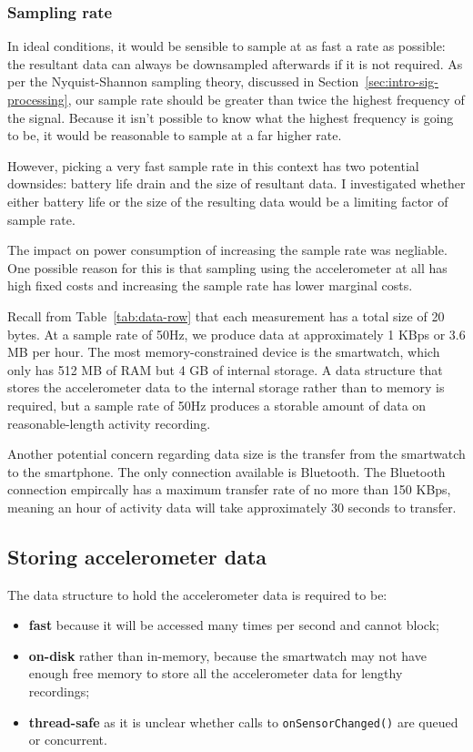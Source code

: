       \subsubsection{Sampling rate}
        In ideal conditions, it would be sensible to sample at as fast a rate as possible: the resultant data can always be downsampled afterwards if it is not required. As per the Nyquist-Shannon sampling theory, discussed in Section~\ref{sec:intro-sig-processing}, our sample rate should be greater than twice the highest frequency of the signal. Because it isn't possible to know what the highest frequency is going to be, it would be reasonable to sample at a far higher rate. 
        
        However, picking a very fast sample rate in this context has two potential downsides: battery life drain and the size of resultant data. I investigated whether either battery life or the size of the resulting data would be a limiting factor of sample rate.
        
        The impact on power consumption of increasing the sample rate was negliable. One possible reason for this is that sampling using the accelerometer at all has high fixed costs and increasing the sample rate has lower marginal costs.
      
        Recall from Table~\ref{tab:data-row} that each measurement has a total size of 20 bytes. At a sample rate of 50\si{Hz}, we produce data at approximately 1 KBps or 3.6 MB per hour. The most memory-constrained device is the smartwatch, which only has 512 MB of RAM but 4 GB of internal storage. A data structure that stores the accelerometer data to the internal storage rather than to memory is required, but a sample rate of 50\si{Hz} produces a storable amount of data on reasonable-length activity recording.
        
        Another potential concern regarding data size is the transfer from the smartwatch to the smartphone. The only connection available is Bluetooth. The Bluetooth connection empircally has a maximum transfer rate of no more than 150 KBps, meaning an hour of activity data will take approximately 30 seconds to transfer.

    \subsection{Storing accelerometer data}
      \label{sec:storing-accelerometer-data}
      The data structure to hold the accelerometer data is required to be:
      \begin{itemize}
        \item \textbf{fast} because it will be accessed many times per second and cannot block;
        \item \textbf{on-disk} rather than in-memory, because the smartwatch may not have enough free memory to store all the accelerometer data for lengthy recordings;
        \item \textbf{thread-safe} as it is unclear whether calls to \texttt{onSensorChanged()} are queued or concurrent.
      \end{itemize}
      
